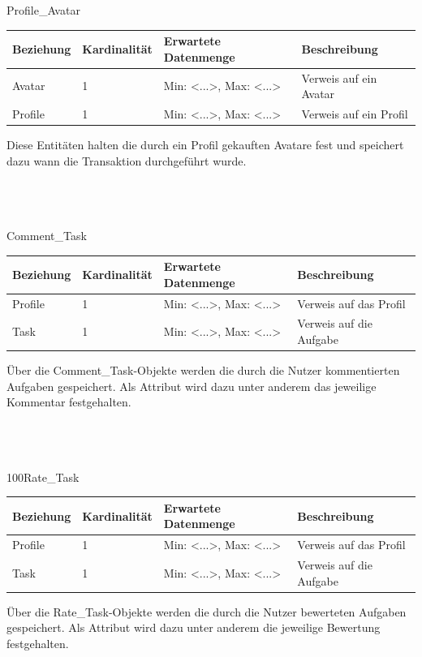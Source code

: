 \newpage
\begin{entity}{80}{Profile\_Avatar}
\begin{center}
	\begin{longtable}{|m{4cm}|m{}|m{}|m{}|}
 	 \hline
 	 \textbf{Beziehung} & \textbf{Kardinalität} &  \textbf{Erwartete Datenmenge} & \textbf{Beschreibung} \\
  	\hline
	Avatar & 1  & Min: <...>, Max: <...> & Verweis auf ein Avatar\\
	  \hline
  	Profile & 1  & Min: <...>, Max: <...> & Verweis auf ein Profil\\
	  \hline
	\end{longtable}
\end{center}
Diese Entitäten halten die durch ein Profil gekauften Avatare fest und speichert dazu wann die Transaktion durchgeführt wurde.\\\\\\\
\end{entity}

\begin{entity}{90}{Comment\_Task}
\begin{center}
	\begin{longtable}{|m{4cm}|m{}|m{}|m{}|}
 	 \hline
 	 \textbf{Beziehung} & \textbf{Kardinalität} &  \textbf{Erwartete Datenmenge} & \textbf{Beschreibung} \\
  	\hline
	Profile & 1  & Min: <...>, Max: <...> & Verweis auf das Profil\\
	  \hline
  	Task & 1  & Min: <...>, Max: <...> & Verweis auf die Aufgabe\\
	  \hline
	\end{longtable}
\end{center}
Über die \glqq Comment\_Task\grqq-Objekte werden die durch die Nutzer kommentierten Aufgaben gespeichert. Als Attribut wird dazu unter anderem das jeweilige Kommentar festgehalten.\\\\\\\
\end{entity}

\begin{entity}{100}{Rate\_Task}
\begin{center}
	\begin{longtable}{|m{4cm}|m{2,5cm}|m{4,5cm}|m{3,5cm}|}
 	 \hline
 	 \textbf{Beziehung} & \textbf{Kardinalität} &  \textbf{Erwartete Datenmenge} & \textbf{Beschreibung} \\
  	\hline
	Profile & 1  & Min: <...>, Max: <...> & Verweis auf das Profil\\
	  \hline
  	Task & 1  & Min: <...>, Max: <...> & Verweis auf die Aufgabe\\
	  \hline
	\end{longtable}
\end{center}
Über die \glqq Rate\_Task\grqq-Objekte werden die durch die Nutzer bewerteten Aufgaben gespeichert. Als Attribut wird dazu unter anderem die jeweilige Bewertung festgehalten.\\\\\\\
\end{entity}

